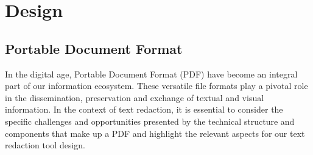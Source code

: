 \chapter{Design}

\section{Portable Document Format}
In the digital age, Portable Document Format (PDF) have become an integral part of our information ecosystem. These versatile file formats play a pivotal role in the dissemination, preservation and exchange of textual and visual information. In the context of text redaction, it is essential to consider the specific challenges and opportunities presented by the technical structure and components that make up a PDF and highlight the relevant aspects for our text redaction tool design.
